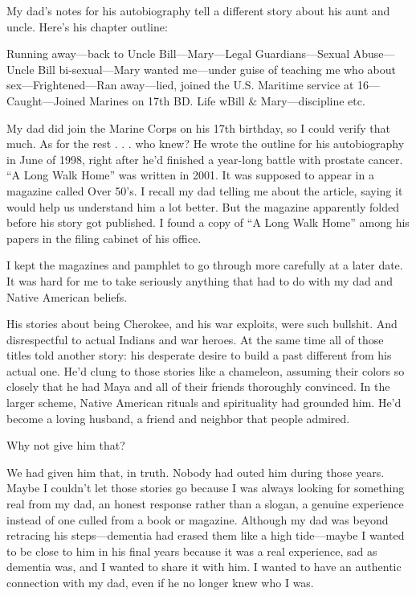 \documentclass[12pt]{book}
\begin{document}
My dad's notes for his autobiography tell a different story about his aunt and uncle. Here's his chapter outline:

Running away---back to Uncle Bill---Mary---Legal Guardians---Sexual Abuse--- Uncle Bill bi-sexual---Mary wanted me---under guise of teaching me who about sex---Frightened---Ran away---lied, joined the U.S. Maritime service at 16--- Caught---Joined Marines on 17th B\/D. Life w\/Bill \& Mary---discipline etc.

My dad did join the Marine Corps on his 17th birthday, so I could verify that much. As for the rest . . . who knew? He wrote the outline for his autobiography in June of 1998, right after he'd finished a year-long battle with prostate cancer. ``A Long Walk Home'' was written in 2001. It was supposed to appear in a magazine called Over 50's. I recall my dad telling me about the article, saying it would help us understand him a lot better. But the magazine apparently folded before his story got published. I found a copy of ``A Long Walk Home'' among his papers in the filing cabinet of his office.

I kept the magazines and pamphlet to go through more carefully at a later date. It was hard for me to take seriously anything that had to do with my dad and Native American beliefs.



His stories about being Cherokee, and his war exploits, were such bullshit. And disrespectful to actual Indians and war heroes. At the same time all of those titles told another story: his desperate desire to build a past different from his actual one. He'd clung to those stories like a chameleon, assuming their colors so closely that he had Maya and all of their friends thoroughly convinced. In the larger scheme, Native American rituals and spirituality had grounded him. He'd become a loving husband, a friend and neighbor that people admired.

Why not give him that?

We had given him that, in truth. Nobody had outed him during those years. Maybe I couldn't let those stories go because I was always looking for something real from my dad, an honest response rather than a slogan, a genuine experience instead of one culled from a book or magazine. Although my dad was beyond retracing his steps---dementia had erased them like a high tide---maybe I wanted to be close to him in his final years because it was a real experience, sad as dementia was, and I wanted to share it with him. I wanted to have an authentic connection with my dad, even if he no longer knew who I was. 
\end{document}
